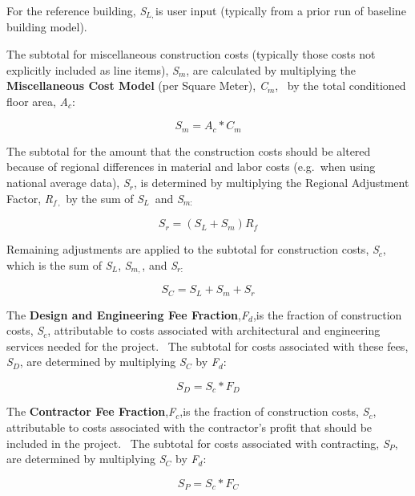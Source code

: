 For the reference building, \emph{S\(_{L,}\)}is user input (typically from a prior run of baseline building model).

The subtotal for miscellaneous construction costs (typically those costs not explicitly included as line items), \emph{S\(_{m}\)}, are calculated by multiplying the \textbf{Miscellaneous Cost Model} (per Square Meter), \emph{C\(_{m}\)},~ by the total conditioned floor area, \emph{A\(_{c}\)}:

\begin{equation}
{S_m} = {A_c} * {C_m}
\end{equation}

The subtotal for the amount that the construction costs should be altered because of regional differences in material and labor costs (e.g.~when using national average data), \emph{S\(_{r}\)}, is determined by multiplying the Regional Adjustment Factor, \emph{R\(_{f\, ,}\)} by the sum of \emph{S\(_{L}\)}~and \emph{S\(_{m:}\)}

\begin{equation}
{S_r} = ({S_L} + {S_m}){R_f}
\end{equation}

Remaining adjustments are applied to the subtotal for construction costs, \emph{S\(_{c}\)}, which is the sum of \emph{S\(_{L}\)}, \emph{S\(_{m,}\)}, and \emph{S\(_{r:}\)}

\begin{equation}
{S_C} = {S_L} + {S_m} + {S_r}
\end{equation}

The \textbf{Design and Engineering Fee Fraction},\emph{F\(_{d}\)},is the fraction of construction costs, \emph{S\(_{c}\)}, attributable to costs associated with architectural and engineering services needed for the project.~ The subtotal for costs associated with these fees, \emph{S\(_{D}\)}, are determined by multiplying \emph{S\(_{C}\)} by \emph{F\(_{d}\)}:

\begin{equation}
{S_D} = {S_c}*{F_D}
\end{equation}

The \textbf{Contractor Fee Fraction},\emph{F\(_{c}\)},is the fraction of construction costs, \emph{S\(_{c}\)}, attributable to costs associated with the contractor's profit that should be included in the project.~ The subtotal for costs associated with contracting, \emph{S\(_{P}\)}, are determined by multiplying \emph{S\(_{C}\)} by \emph{F\(_{d}\)}:

\begin{equation}
{S_P} = {S_c}*{F_C}
\end{equation}

